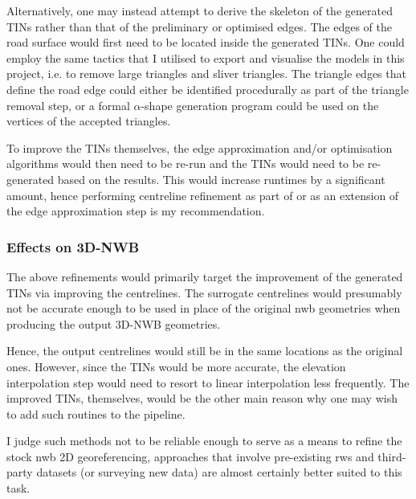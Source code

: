 Alternatively, one may instead attempt to derive the skeleton of the generated TINs rather than that of the preliminary or optimised edges. The edges of the road surface would first need to be located inside the generated TINs. One could employ the same tactics that I utilised to export and visualise the models in this project, i.e. to remove large triangles and sliver triangles. The triangle edges that define the road edge could either be identified procedurally as part of the triangle removal step, or a formal $\alpha$-shape generation program could be used on the vertices of the accepted triangles.

To improve the TINs themselves, the edge approximation and/or optimisation algorithms would then need to be re-run and the TINs would need to be re-generated based on the results. This would increase runtimes by a significant amount, hence performing centreline refinement as part of or as an extension of the edge approximation step is my recommendation.

\subsubsection{Effects on 3D-NWB}

The above refinements would primarily target the improvement of the generated TINs via improving the centrelines. The surrogate centrelines would presumably not be accurate enough to be used in place of the original \ac{nwb} geometries when producing the output 3D-NWB geometries.

Hence, the output centrelines would still be in the same locations as the original ones. However, since the TINs would be more accurate, the elevation interpolation step would need to resort to linear interpolation less frequently. The improved TINs, themselves, would be the other main reason why one may wish to add such routines to the pipeline.

I judge such methods not to be reliable enough to serve as a means to refine the stock \ac{nwb} 2D georeferencing, approaches that involve pre-existing \ac{rws} and third-party datasets (or surveying new data) are almost certainly better suited to this task.